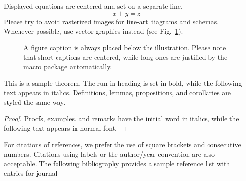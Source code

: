 \documentclass[runningheads]{llncs}
\begin{document}
    \noindent Displayed equations are centered and set on a separate
    line.
    \begin{equation}
        x + y = z
    \end{equation}
    Please try to avoid rasterized images for line-art diagrams and
    schemas. Whenever possible, use vector graphics instead (see
    Fig.~\ref{fig1}).

    \begin{figure}
        \caption{A figure caption is always placed below the illustration.
        Please note that short captions are centered, while long ones are
        justified by the macro package automatically.} \label{fig1}
    \end{figure}

    \begin{theorem}
        This is a sample theorem. The run-in heading is set in bold, while
        the following text appears in italics. Definitions, lemmas,
        propositions, and corollaries are styled the same way.
    \end{theorem}
%
%
    \begin{proof}
        Proofs, examples, and remarks have the initial word in italics,
        while the following text appears in normal font.
    \end{proof}
    For citations of references, we prefer the use of square brackets
    and consecutive numbers. Citations using labels or the author/year
    convention are also acceptable. The following bibliography provides
    a sample reference list with entries for journal
%
%
%
    
    
%
\end{document}
